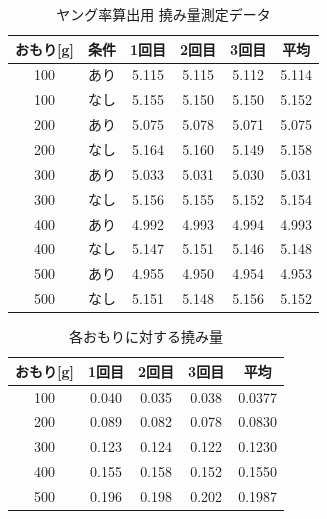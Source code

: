 \documentclass[10pt,a4paper,titlepage]{jreport}
\begin{document}
\begin{table}[H]
\centering
\caption{ヤング率算出用 撓み量測定データ}
\label{tab:deflection}

\begin{tabular}{|c|c|c|c|c|c|}
\hline
おもり[g] & 条件 & 1回目 & 2回目 & 3回目 & 平均 \\ \hline

100 & あり & 5.115 & 5.115 & 5.112 & 5.114 \\ \hline
100 & なし & 5.155 & 5.150 & 5.150 & 5.152 \\ \hline

200 & あり & 5.075 & 5.078 & 5.071 & 5.075 \\ \hline
200 & なし & 5.164 & 5.160 & 5.149 & 5.158 \\ \hline

300 & あり & 5.033 & 5.031 & 5.030 & 5.031 \\ \hline
300 & なし & 5.156 & 5.155 & 5.152 & 5.154 \\ \hline

400 & あり & 4.992 & 4.993 & 4.994 & 4.993 \\ \hline
400 & なし & 5.147 & 5.151 & 5.146 & 5.148 \\ \hline

500 & あり & 4.955 & 4.950 & 4.954 & 4.953 \\ \hline
500 & なし & 5.151 & 5.148 & 5.156 & 5.152 \\ \hline

\end{tabular}
\end{table}

\begin{table}[H]
\centering
\caption{各おもりに対する撓み量}
\label{tab:deflection_difference}

\begin{tabular}{|c|c|c|c|c|}
\hline
おもり[g] & 1回目 & 2回目 & 3回目 & 平均 \\ \hline

100 & 0.040 & 0.035 & 0.038 & 0.0377 \\ \hline
200 & 0.089 & 0.082 & 0.078 & 0.0830 \\ \hline
300 & 0.123 & 0.124 & 0.122 & 0.1230 \\ \hline
400 & 0.155 & 0.158 & 0.152 & 0.1550 \\ \hline
500 & 0.196 & 0.198 & 0.202 & 0.1987 \\ \hline

\end{tabular}
\end{table}
\end{document}
